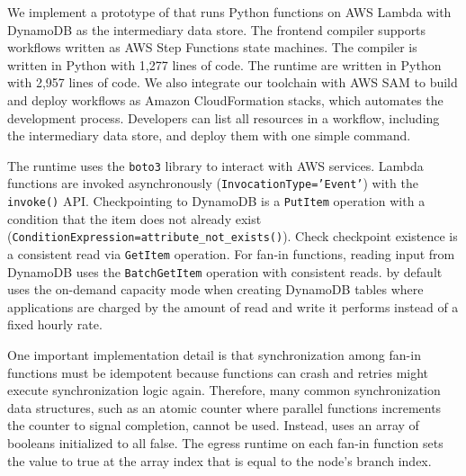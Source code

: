 We implement a prototype of \name{} that runs Python functions on AWS Lambda
with DynamoDB as the intermediary data store. The frontend compiler
supports workflows written as AWS Step Functions state machines. The compiler
is written in Python with 1,277 lines of code.
The runtime are written in Python with 2,957 lines of code. We also integrate
our toolchain with AWS SAM to build and deploy \name{} workflows as Amazon
CloudFormation stacks, which automates the development process. Developers can
list all resources in a workflow, including the intermediary data store, and
deploy them with one simple command.

The runtime uses the \texttt{boto3} library to interact with AWS services.
Lambda functions are invoked asynchronously (\texttt{InvocationType='Event'})
with the \texttt{invoke()} API. Checkpointing to DynamoDB is a
\texttt{PutItem} operation with a condition that the item does not already
exist (\texttt{ConditionExpression=attribute\_not\_exists()}). Check
checkpoint existence is a consistent read via \texttt{GetItem} operation. For
fan-in functions, reading input from DynamoDB uses the \texttt{BatchGetItem}
operation with consistent reads.
\name{} by default uses the on-demand capacity mode when creating DynamoDB
tables where applications are charged by the amount of read and write it
performs instead of a fixed hourly rate.

One important implementation detail is that synchronization among fan-in
functions must be idempotent because functions can crash and retries might
execute synchronization logic again. Therefore, many common synchronization
data structures, such as an atomic counter where parallel functions increments
the counter to signal completion, cannot be used. Instead, \name{} uses an
array of booleans initialized to all false. The egress runtime on each fan-in
function sets the value to true at the array index that is equal to the node's
branch index.
